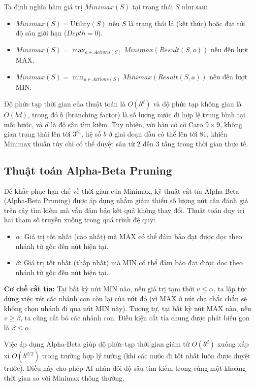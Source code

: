 \documentclass[13pt,a4paper]{article}
\begin{document}
Ta định nghĩa hàm giá trị $Minimax(S)$ tại trạng thái $S$ như sau:
\begin{itemize}
    \item $Minimax(S) = \text{Utility}(S)$ nếu $S$ là trạng thái lá (kết thúc) hoặc đạt tới độ sâu giới hạn ($Depth = 0$).
    \item $Minimax(S) = \max_{a \in Actions(S)} Minimax(Result(S, a))$ nếu đến lượt MAX.
    \item $Minimax(S) = \min_{a \in Actions(S)} Minimax(Result(S, a))$ nếu đến lượt MIN.
\end{itemize}

Độ phức tạp thời gian của thuật toán là $O(b^d)$ và độ phức tạp không gian là $O(bd)$, trong đó $b$ (branching factor) là số lượng nước đi hợp lệ trung bình tại mỗi bước, và $d$ là độ sâu tìm kiếm. Tuy nhiên, với bàn cờ cờ Caro $9 \times 9$, không gian trạng thái lên tới $3^{81}$, hệ số $b$ ở giai đoạn đầu có thể lên tới 81, khiến Minimax thuần túy chỉ có thể duyệt sâu từ 2 đến 3 tầng trong thời gian thực tế.

\subsection{Thuật toán Alpha-Beta Pruning}
Để khắc phục hạn chế về thời gian của Minimax, kỹ thuật cắt tỉa Alpha-Beta (Alpha-Beta Pruning) được áp dụng nhằm giảm thiểu số lượng nút cần đánh giá trên cây tìm kiếm mà vẫn đảm bảo kết quả không thay đổi. Thuật toán duy trì hai tham số truyền xuống trong quá trình đệ quy:
\begin{itemize}
    \item $\alpha$: Giá trị tốt nhất (cao nhất) mà MAX có thể đảm bảo đạt được dọc theo nhánh từ gốc đến nút hiện tại.
    \item $\beta$: Giá trị tốt nhất (thấp nhất) mà MIN có thể đảm bảo đạt được dọc theo nhánh từ gốc đến nút hiện tại.
\end{itemize}

\textbf{Cơ chế cắt tỉa:} Tại bất kỳ nút MIN nào, nếu giá trị tạm thời $v \le \alpha$, ta lập tức dừng việc xét các nhánh con còn lại của nút đó (vì MAX ở nút cha chắc chắn sẽ không chọn nhánh đi qua nút MIN này). Tương tự, tại bất kỳ nút MAX nào, nếu $v \ge \beta$, ta cũng cắt bỏ các nhánh con. Điều kiện cắt tỉa chung được phát biểu gọn là $\beta \le \alpha$.

Việc áp dụng Alpha-Beta giúp độ phức tạp thời gian giảm từ $O(b^d)$ xuống xấp xỉ $O(b^{d/2})$ trong trường hợp lý tưởng (khi các nước đi tốt nhất luôn được duyệt trước). Điều này cho phép AI nhân đôi độ sâu tìm kiếm trong cùng một khoảng thời gian so với Minimax thông thường.
\end{document}
